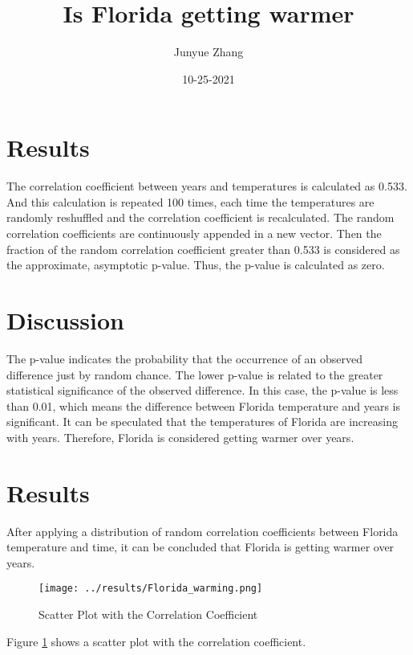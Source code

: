 \documentclass[10pt, a4paper]{article}
\title{Is Florida getting warmer}
\author{Junyue Zhang}
\date{10-25-2021}
\begin{document}
  \maketitle
  
  \section{Results}
    The correlation coefficient between years and temperatures is calculated as 0.533. And this calculation is repeated 100 times, each time the temperatures are randomly reshuffled and the correlation coefficient is recalculated. The random correlation coefficients are continuously appended in a new vector. Then the fraction of the random correlation coefficient greater than 0.533 is considered as the approximate, asymptotic p-value. 
    Thus, the p-value is calculated as zero.  
   
  \section{Discussion}
    The p-value indicates the probability that the occurrence of an observed difference just by random chance. The lower p-value is related to the greater statistical significance of the observed difference.
    In this case, the p-value is less than 0.01, which means the difference between Florida temperature and years is significant.
    It can be speculated that the temperatures of Florida are increasing with years.  
    Therefore, Florida is considered getting warmer over years.

  \section{Results}
    After applying a distribution of random correlation coefficients between Florida temperature and time, it can be concluded that Florida is getting warmer over years.

\begin{figure}[h]
  \centering
  \texttt{[image: ../results/Florida\_warming.png]}
  \caption{Scatter Plot with the Correlation Coefficient}
  \label{figure1}
\end{figure}
Figure \ref{figure1} shows a scatter plot with the correlation coefficient.
\end{document}
